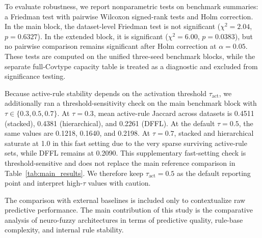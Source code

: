 \documentclass[runningheads]{llncs}
\begin{document}
To evaluate robustness, we report nonparametric tests on benchmark summaries: a Friedman test with pairwise Wilcoxon signed-rank tests and Holm correction. In the main block, the dataset-level Friedman test is not significant ($\chi^2=2.04$, $p=0.6327$). In the extended block, it is significant ($\chi^2=6.00$, $p=0.0383$), but no pairwise comparison remains significant after Holm correction at $\alpha=0.05$.
These tests are computed on the unified three-seed benchmark blocks, while the separate full-Covtype capacity table is treated as a diagnostic and excluded from significance testing.

Because active-rule stability depends on the activation threshold $\tau_{\mathrm{act}}$, we additionally ran a threshold-sensitivity check on the main benchmark block with $\tau\in\{0.3,0.5,0.7\}$. At $\tau=0.3$, mean active-rule Jaccard across datasets is 0.4511 (stacked), 0.4381 (hierarchical), and 0.2261 (DFFL). At the default $\tau=0.5$, the same values are 0.1218, 0.1640, and 0.2198. At $\tau=0.7$, stacked and hierarchical saturate at 1.0 in this fast setting due to the very sparse surviving active-rule sets, while DFFL remains at 0.2090. This supplementary fast-setting check is threshold-sensitive and does not replace the main reference comparison in Table~\ref{tab:main_results}. We therefore keep $\tau_{\mathrm{act}}=0.5$ as the default reporting point and interpret high-$\tau$ values with caution.

The comparison with external baselines is included only to contextualize raw predictive performance. The main contribution of this study is the comparative analysis of neuro-fuzzy architectures in terms of predictive quality, rule-base complexity, and internal rule stability.
\end{document}
